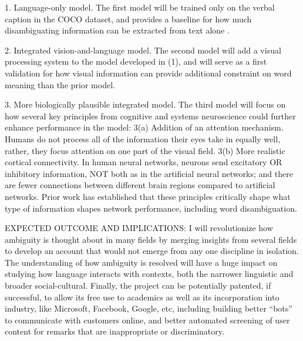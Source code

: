 \documentclass[letterpaper, 12pt]{article}
\begin{document}
1.  Language-only model. The first model will be trained only on the verbal caption in the COCO dataset, and provides a baseline for how much disambiguating information can be extracted from text alone \citep{beekhuizenWhatCompanySemantically2018}.

2.  Integrated vision-and-language model.  The second model will add a visual processing system to the model developed in (1), and will serve as a first validation for how visual information can provide additional constraint on word meaning than the prior model.

3.  More biologically plausible integrated model.  The third model will focus on how several key principles from cognitive and systems neuroscience could further enhance performance in the model: 3(a) Addition of an attention mechanism. Humans do not process all of the information their eyes take in equally well, rather, they focus attention on one part of the visual field. 3(b) More realistic cortical connectivity. In human neural networks, neurons send excitatory OR inhibitory information, NOT both as in the artificial neural networks; and there are fewer connections between different brain regions compared to artificial networks. Prior work \citep{laszloPSPsERPsApplying2014, Armstrong2016Disparatesemanticambiguity} has established that these principles critically shape what type of information shapes network performance, including word disambiguation. 

EXPECTED OUTCOME AND IMPLICATIONS: I will revolutionize how ambiguity is thought about in many fields by merging insights from several fields to develop an account that would not emerge from any one discipline in isolation. The understanding of how ambiguity is resolved will have a huge impact on studying how language interacts with contexts, both the narrower linguistic and broader social-cultural.  Finally, the project can be potentially patented, if successful, to allow its free use to academics as well as its incorporation into industry, like Microsoft, Facebook, Google, etc, including building better “bots” to communicate with customers online, and better automated screening of user content for remarks that are inappropriate or discriminatory.
\end{document}

